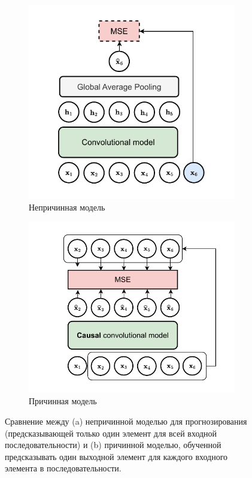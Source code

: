 \begin{figure}[t]
    \centering
    \begin{subfigure}[b]{0.45\textwidth}
    \includegraphics[width=1.0\textwidth]{images/forecasting-Page-1}
    \caption{Непричинная модель}
    \label{fig:forecasting_a}
    \end{subfigure}
    \begin{subfigure}[b]{0.48\textwidth}
    \includegraphics[width=1.0\textwidth]{images/forecasting-Pagina-2}
    \caption{Причинная модель}
    \label{fig:forecasting_b}
    \end{subfigure}
    \caption{Сравнение между (a) непричинной моделью для прогнозирования (предсказывающей только один элемент для всей входной последовательности) и (b) причинной моделью, обученной предсказывать один выходной элемент для каждого входного элемента в последовательности.}
    \label{fig:forecasting}
\end{figure}


